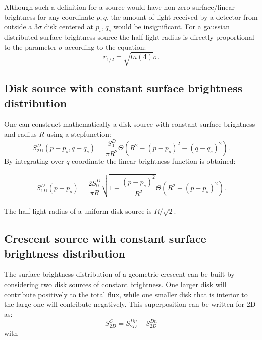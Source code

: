 \documentclass[usenatbib]{mn2e}
\begin{document}
Although such a definition for a source would have non-zero surface/linear brightness for any coordinate $p,q$, the amount of light received by a detector from outside a $3 \sigma$ disk centered at $p_s, q_s$ 
would be insignificant. For a gaussian distributed surface brightness source the half-light radius is directly proportional to the parameter $\sigma$ according to the equation:
\begin{equation}
r_{1/2} = \sqrt{ln(4)} \sigma.
\end{equation}

\subsection{Disk source with constant surface brightness distribution}

One can construct mathematically a disk source with constant surface brightness and radius $R$ using a stepfunction:
\begin{equation}
 S_{2D}^D(p-p_s, q-q_s) = \frac{S_0^D}{\pi R^2} \Theta \left( R^2 - \left( p-p_s \right)^2 - \left( q-q_s \right)^2 \right).
\end{equation}
By integrating over $q$ coordinate the linear brightness function is obtained:


\begin{equation}
 S_{1D}^D(p-p_s) = \frac{2 S_0^D}{\pi R}  \sqrt{1 - \frac{(p-p_s)^2}{R^2} }    \Theta \left( R^2 - \left( p-p_s \right)^2 \right).
\end{equation}
\\
The half-light radius of a uniform disk source is $R/\sqrt{2}$.

\subsection{Crescent source with constant surface brightness distribution}\label{subsec:crescent}

The surface brightness distribution of a geometric crescent can be built by considering two disk sources of constant brightness. One larger disk will contribute positively to the total flux, while one smaller disk 
that is interior to the large one will contribute negatively. This superposition can be written for 2D as:\\

\begin{equation}
 S_{2D}^C =  S_{2D}^{Dp} -  S_{2D}^{Dn}  
 \label{eqn:s2d}
\end{equation}
with\\
\end{document}
